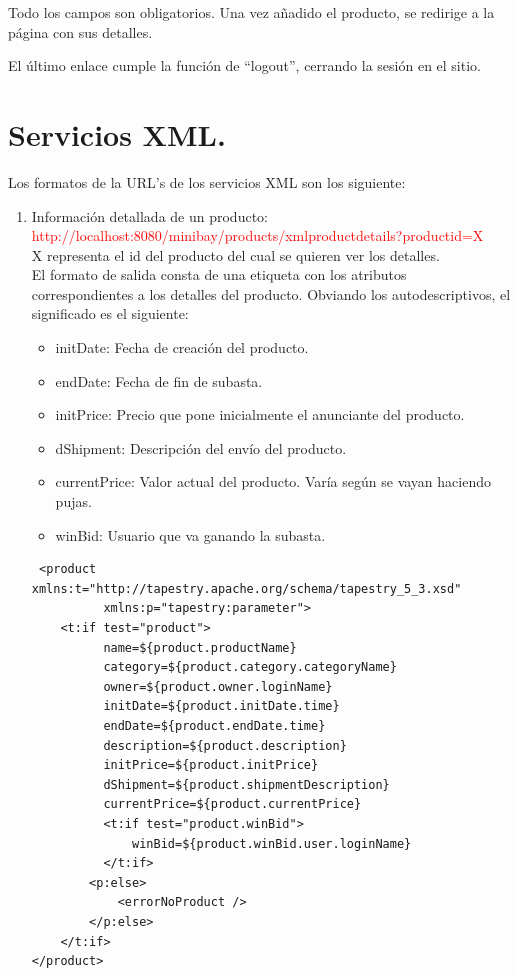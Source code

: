 \documentclass[12pt,a4paper,twoside,spanish]{article}      %
\begin{document}
Todo los campos son obligatorios. Una vez añadido el producto, se redirige a la página con sus detalles.

El último enlace cumple la función de ``logout'', cerrando la sesión en el sitio.
\section{Servicios XML.}
Los formatos de la URL's de los servicios XML son los siguiente:

\begin{enumerate}
 \item Información detallada de un producto: \\
    \textcolor{red}{http://localhost:8080/minibay/products/xmlproductdetails?productid=X}\\
    X representa el id del producto del cual se quieren ver los detalles.\\
    El formato de salida consta de una etiqueta con los atributos correspondientes a los detalles del producto. Obviando los
    autodescriptivos, el significado es el siguiente:
    \begin{itemize}
     \item initDate: Fecha de creación del producto.
     \item endDate: Fecha de fin de subasta.
     \item initPrice: Precio que pone inicialmente el anunciante del producto.
     \item dShipment: Descripción del envío del producto.
     \item currentPrice: Valor actual del producto. Varía según se vayan haciendo pujas.
     \item winBid: Usuario que va ganando la subasta.
    \end{itemize}
\begin{verbatim}
 <product xmlns:t="http://tapestry.apache.org/schema/tapestry_5_3.xsd"
		  xmlns:p="tapestry:parameter">
	<t:if test="product">
	      name=${product.productName}
	      category=${product.category.categoryName}
	      owner=${product.owner.loginName}
	      initDate=${product.initDate.time}
	      endDate=${product.endDate.time}
	      description=${product.description}
	      initPrice=${product.initPrice}
	      dShipment=${product.shipmentDescription}
	      currentPrice=${product.currentPrice}
	      <t:if test="product.winBid">
		      winBid=${product.winBid.user.loginName}
	      </t:if>
	    <p:else>
		    <errorNoProduct />
	    </p:else>
    </t:if>
</product>
\end{verbatim}



\end{enumerate}
\end{document}
